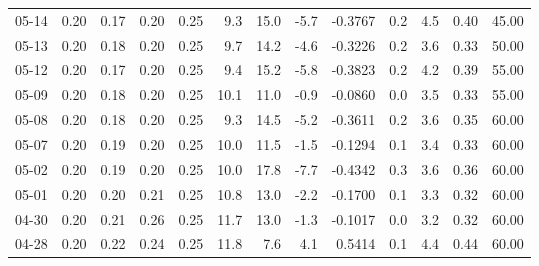 \begin{threeparttable}
{\begin{tabular}{lrrrrrrrrrrrr}
  05-14 &          0.20 &          0.17 &          0.20 &        0.25 &                 9.3 &                15.0 &       -5.7 &      -0.3767 &                 0.2 &              4.5 &            0.40 &                  45.00 \\
  05-13 &          0.20 &          0.18 &          0.20 &        0.25 &                 9.7 &                14.2 &       -4.6 &      -0.3226 &                 0.2 &              3.6 &            0.33 &                  50.00 \\
  05-12 &          0.20 &          0.17 &          0.20 &        0.25 &                 9.4 &                15.2 &       -5.8 &      -0.3823 &                 0.2 &              4.2 &            0.39 &                  55.00 \\
  05-09 &          0.20 &          0.18 &          0.20 &        0.25 &                10.1 &                11.0 &       -0.9 &      -0.0860 &                 0.0 &              3.5 &            0.33 &                  55.00 \\
  05-08 &          0.20 &          0.18 &          0.20 &        0.25 &                 9.3 &                14.5 &       -5.2 &      -0.3611 &                 0.2 &              3.6 &            0.35 &                  60.00 \\
  05-07 &          0.20 &          0.19 &          0.20 &        0.25 &                10.0 &                11.5 &       -1.5 &      -0.1294 &                 0.1 &              3.4 &            0.33 &                  60.00 \\
  05-02 &          0.20 &          0.19 &          0.20 &        0.25 &                10.0 &                17.8 &       -7.7 &      -0.4342 &                 0.3 &              3.6 &            0.36 &                  60.00 \\
  05-01 &          0.20 &          0.20 &          0.21 &        0.25 &                10.8 &                13.0 &       -2.2 &      -0.1700 &                 0.1 &              3.3 &            0.32 &                  60.00 \\
  04-30 &          0.20 &          0.21 &          0.26 &        0.25 &                11.7 &                13.0 &       -1.3 &      -0.1017 &                 0.0 &              3.2 &            0.32 &                  60.00 \\
  04-28 &          0.20 &          0.22 &          0.24 &        0.25 &                11.8 &                 7.6 &        4.1 &       0.5414 &                 0.1 &              4.4 &            0.44 &                  60.00 \\

\end{tabular}}
\end{threeparttable}
